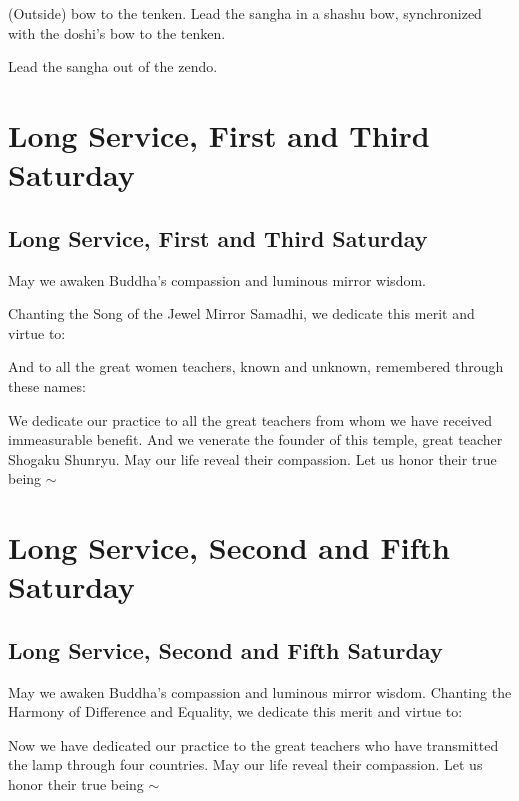 \documentclass{chantbook}
\begin{document}
(Outside) bow to the tenken.
\doan Lead the sangha in a shashu bow, synchronized with the doshi's bow to
the tenken.

Lead the sangha out of the zendo.

\part{Long Service, First and Third Saturday}
\chapter{Long Service, First and Third Saturday}
\begin{service}
\kokyo \makaHannyaHaramittaShingyo
\kokyo \enmeiJukkuKannonGyo
\kokyo {}
\sangha \allBuddhas
\kokyo \songOfTheJewelMirrorSamadhi
\kokyo May we awaken Buddha's compassion and luminous mirror wisdom.

Chanting the Song of the Jewel Mirror Samadhi, we dedicate this merit and
virtue to: \bigspace\clank

\ancestorsShort

\kokyo And to all the great women teachers, known and unknown, remembered
through these names: \bigspace\clank

\femaleAncestors

\kokyo We dedicate our practice to all the great teachers from whom we have
received immeasurable benefit. And we venerate the founder of this temple,
great teacher Shogaku Shunryu. May our life reveal their compassion. Let us
honor their true being $\sim$ \largebell
\end{service}

\part{Long Service, Second and Fifth Saturday}
\chapter{Long Service, Second and Fifth Saturday}

\begin{service}
\kokyo \makaHannyaHaramittaShingyo
\kokyo \shosaimyoKichijoDharani
\kokyo {}
\sangha \allBuddhas
\kokyo \harmonyOfDifferenceAndEquality
\kokyo May we awaken Buddha's compassion and luminous mirror wisdom. Chanting
the Harmony of Difference and Equality, we dedicate this merit and virtue to:

\ancestorsLong

\kokyo Now we have dedicated our practice to the great teachers who have
transmitted the lamp through four countries. May our life reveal their
compassion. Let us honor their true being $\sim$ \largebell
\end{service}
\end{document}
